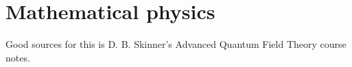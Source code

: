 \section{Mathematical physics}

Good sources for this is D. B. Skinner's Advanced Quantum Field Theory course notes.